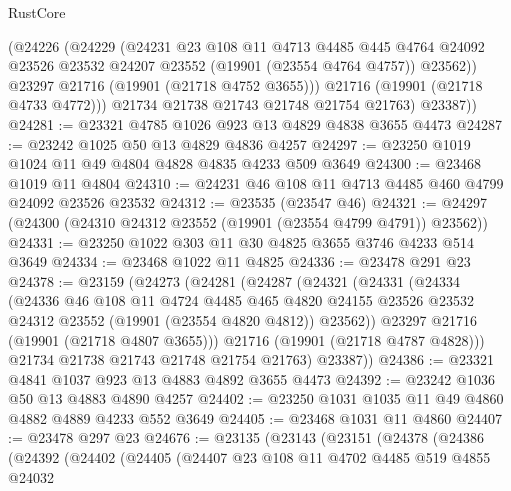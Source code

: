 \begin{lexlean}{RustCore}
\begin{coremodule}
            (@24226
              (@24229
                (@24231
                  @23
                  @108
                  @11
                  @4713
                  @4485
                  @445
                  @4764
                  @24092
                  @23526
                  @23532
                  @24207
                  @23552
                  (@19901 (@23554 @4764 @4757))
                  @23562))
              @23297
              @21716
              (@19901 (@21718 @4752 @3655)))
            @21716
            (@19901 (@21718 @4733 @4772)))
          @21734
          @21738
          @21743
          @21748
          @21754
          @21763)
        @23387))
@24281 := @23321 @4785 @1026 @923 @13 @4829 @4838 @3655 @4473
@24287 := @23242 @1025 @50 @13 @4829 @4836 @4257
@24297 := @23250 @1019 @1024 @11 @49 @4804 @4828 @4835 @4233 @509 @3649
@24300 := @23468 @1019 @11 @4804
@24310 := @24231 @46 @108 @11 @4713 @4485 @460 @4799 @24092 @23526 @23532
@24312 := @23535 (@23547 @46)
@24321 := @24297 (@24300 (@24310 @24312 @23552 (@19901 (@23554 @4799 @4791)) @23562))
@24331 := @23250 @1022 @303 @11 @30 @4825 @3655 @3746 @4233 @514 @3649
@24334 := @23468 @1022 @11 @4825
@24336 := @23478 @291 @23
@24378 := @23159
    (@24273
      (@24281
        (@24287
          (@24321
            (@24331
              (@24334
                (@24336
                  @46
                  @108
                  @11
                  @4724
                  @4485
                  @465
                  @4820
                  @24155
                  @23526
                  @23532
                  @24312
                  @23552
                  (@19901 (@23554 @4820 @4812))
                  @23562))
              @23297
              @21716
              (@19901 (@21718 @4807 @3655)))
            @21716
            (@19901 (@21718 @4787 @4828)))
          @21734
          @21738
          @21743
          @21748
          @21754
          @21763)
        @23387))
@24386 := @23321 @4841 @1037 @923 @13 @4883 @4892 @3655 @4473
@24392 := @23242 @1036 @50 @13 @4883 @4890 @4257
@24402 := @23250 @1031 @1035 @11 @49 @4860 @4882 @4889 @4233 @552 @3649
@24405 := @23468 @1031 @11 @4860
@24407 := @23478 @297 @23
@24676 := @23135
    (@23143
      (@23151
        (@24378
          (@24386
            (@24392
              (@24402
                (@24405
                  (@24407
                    @23
                    @108
                    @11
                    @4702
                    @4485
                    @519
                    @4855
                    @24032

\end{coremodule}
\end{lexlean}
